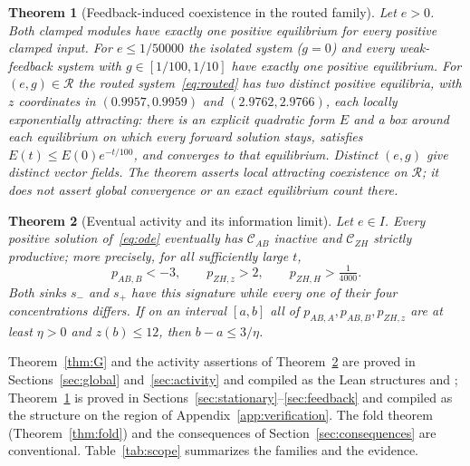 \documentclass[11pt,a4paper]{article}
\theoremstyle{plain}
\newtheorem{theorem}{Theorem}[section]
\theoremstyle{definition}
\theoremstyle{remark}
\newcommand{\Rr}{\mathcal{R}}
\newcommand{\cAB}{\mathcal{C}_{AB}}
\newcommand{\cZH}{\mathcal{C}_{ZH}}
\begin{document}
\begin{theorem}[Feedback-induced coexistence in the routed family]\label{thm:C}
Let $e>0$. Both clamped modules have exactly one positive equilibrium for every positive clamped input. For $e\le1/50000$ the isolated system ($g=0$) and every weak-feedback system with $g\in[1/100,1/10]$ have exactly one positive equilibrium. For $(e,g)\in\Rr$ the routed system~\eqref{eq:routed} has two distinct positive equilibria, with $z$ coordinates in $(0.9957,0.9959)$ and $(2.9762,2.9766)$, each locally exponentially attracting: there is an explicit quadratic form $E$ and a box around each equilibrium on which every forward solution stays, satisfies $E(t)\le E(0)e^{-t/100}$, and converges to that equilibrium. Distinct $(e,g)$ give distinct vector fields. The theorem asserts local attracting coexistence on $\Rr$; it does not assert global convergence or an exact equilibrium count there.
\end{theorem}

\begin{theorem}[Eventual activity and its information limit]\label{thm:A}
Let $e\in I$. Every positive solution of~\eqref{eq:ode} eventually has $\cAB$ inactive and $\cZH$ strictly productive; more precisely, for all sufficiently large $t$,
\begin{equation}\label{eq:margins}
p_{AB,B}<-3,\qquad p_{ZH,z}>2,\qquad p_{ZH,H}>\tfrac1{4000}.
\end{equation}
Both sinks $s_-$ and $s_+$ have this signature while every one of their four concentrations differs. If on an interval $[a,b]$ all of $p_{AB,A},p_{AB,B},p_{ZH,z}$ are at least $\eta>0$ and $z(b)\le12$, then $b-a\le3/\eta$.
\end{theorem}

Theorem~\ref{thm:G} and the activity assertions of Theorem~\ref{thm:A} are proved in Sections~\ref{sec:global} and~\ref{sec:activity} and compiled as the Lean structures  and ; Theorem~\ref{thm:C} is proved in Sections~\ref{sec:stationary}--\ref{sec:feedback} and compiled as the structure  on the region  of Appendix~\ref{app:verification}. The fold theorem (Theorem~\ref{thm:fold}) and the consequences of Section~\ref{sec:consequences} are conventional. Table~\ref{tab:scope} summarizes the families and the evidence.
\end{document}
